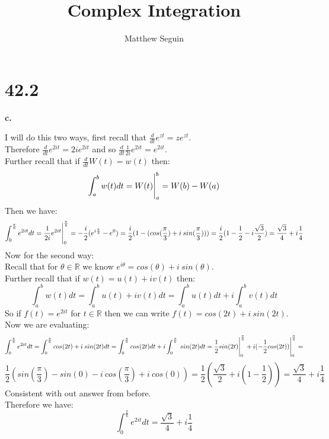 \documentclass{article}
\title{Complex Integration}
\author{Matthew Seguin}
\date{}
\begin{document}
\maketitle

\section*{42.2}

{\Large\textbf{c.}}
\begin{center}
    \doublespacing
    I will do this two ways, first recall that $\frac{d}{dt} e^{zt} = z e^{zt}$.
    \\Therefore $\frac{d}{dt} e^{2it} = 2ie^{2it}$ and so $\frac{d}{dt}\frac{1}{2i}e^{2it} = e^{2it}$.
    \\Further recall that if $\frac{d}{dt} W(t) = w(t)$ then:
    \[\int _a^b w(t) dt = W(t)\Bigg{|}_a^b = W(b) - W(a)\]
    Then we have:
    \[\int _0^{\frac{\pi}{6}} e^{2it} dt =\frac{1}{2i} e^{2it}\Bigg{|}_0^{\frac{\pi}{6}} = -\frac{i}{2}(e^{i\frac{\pi}{3}} - e^0) = \frac{i}{2} (1 - (cos(\frac{\pi}{3}) + i\:sin(\frac{\pi}{3}))) =\frac{i}{2} (1 -\frac{1}{2} - i\frac{\sqrt{3}}{2}) =\frac{\sqrt{3}}{4} + i\frac{1}{4}\]
    Now for the second way:
    \\Recall that for $\theta\in\mathbb{R}$ we know $e^{i\theta} = cos(\theta) + i\:sin(\theta)$.
    \\Further recall that if $w(t) = u(t) + iv(t)$ then:
    \[\int _a^b w(t) dt =\int _a^b u(t) + iv(t) dt =\int _a^b u(t) dt + i\int _a^b v(t) dt\]
    So if $f(t) = e^{2it}$ for $t\in\mathbb{R}$ then we can write $f(t) = cos(2t) + i\:sin(2t)$.
    \\Now we are evaluating:
    \[\int _0^{\frac{\pi}{6}} e^{2it} dt =\int _0^{\frac{\pi}{6}} cos(2t) + i\:sin(2t)dt =\int _0^{\frac{\pi}{6}} cos(2t) dt + i\int _0^{\frac{\pi}{6}}\:sin(2t)dt =\frac{1}{2} sin(2t)\Bigg{|}_0^{\frac{\pi}{6}} + i(-\frac{1}{2} cos(2t))\Bigg{|}_0^{\frac{\pi}{6}} =\]
    \[\frac{1}{2} (sin(\frac{\pi}{3}) - sin(0) - i\:cos(\frac{\pi}{3}) + i\:cos(0)) =\frac{1}{2} (\frac{\sqrt{3}}{2} + i(1 -\frac{1}{2})) =\frac{\sqrt{3}}{4} + i\frac{1}{4}\]
    Consistent with out answer from before.
    \\Therefore we have:
    \[\int _0^{\frac{\pi}{6}} e^{2it} dt =\frac{\sqrt{3}}{4} + i\frac{1}{4}\] \qedsymbol
\end{center}
\end{document}
